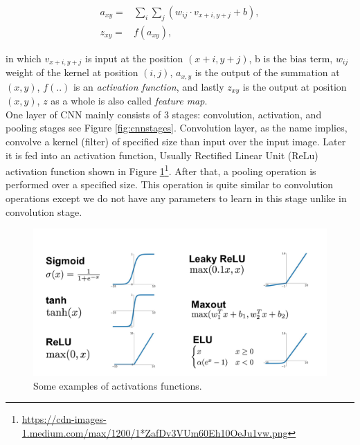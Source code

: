 \begin{equation}
\label{eq:dot}
\begin{aligned}
  a_{xy} =& \sum\limits_{i}\sum\limits_{j}(w_{ij}\cdot v_{x+i,y+j} + b),\\
  z_{xy} =& f(a_{xy}),
\end{aligned}
\end{equation}

in which $v_{x+i,y+j}$ is input at the position $(x+i,y+j)$, b is the bias term, $w_{ij}$ weight of the kernel at position $(i,j)$, $a_{x,y}$ is the output of the summation at $(x,y)$, $f(..)$ is an \textit{activation function}, and lastly $z_{xy}$ is the output at position $(x,y)$, $z$ as a whole is also called \textit{feature map}. \\

One layer of CNN mainly consists of 3 stages:   convolution,  activation, and pooling stages see Figure \ref{fig:cnnstages}. Convolution layer, as the name implies, convolve a kernel (filter) of specified size than input over the input image. Later it is fed into an activation function, Usually Rectified Linear Unit (ReLu) activation function shown in Figure \ref{fig:activations}\footnote{\url{https://cdn-images-1.medium.com/max/1200/1*ZafDv3VUm60Eh10OeJu1vw.png}}. After that, a pooling operation is performed over a specified size.  This operation is quite similar to convolution operations except we do not have any parameters to learn in this stage unlike in convolution stage.\\

\begin{figure}[h!]
	\centering
  \includegraphics[width=0.8\linewidth]{figures/activations.png} 
  \caption{Some examples of activations functions.}
  \label{fig:activations}
\end{figure}

